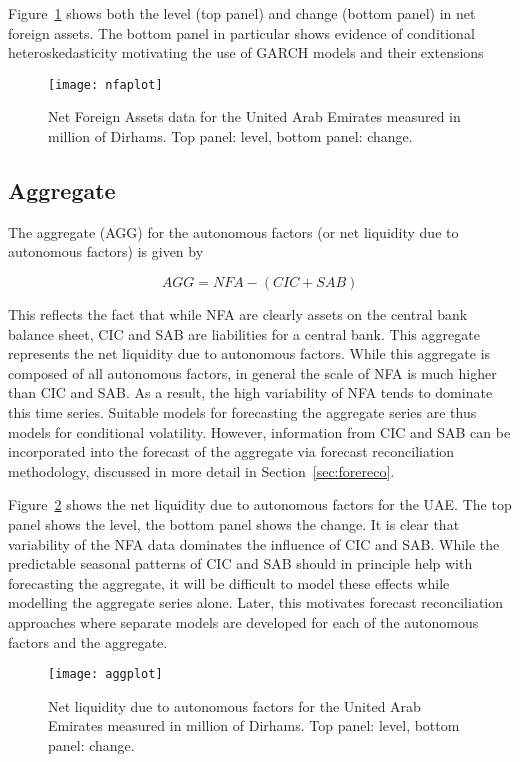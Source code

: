 Figure~\ref{fig:nfadata} shows both  the level (top panel)  and change (bottom
panel) in net foreign assets. The bottom panel in particular shows evidence of
conditional heteroskedasticity  motivating the use  of GARCH models  and their
extensions

\begin{figure}[!h] \centering \texttt{[image: nfaplot]}
    \caption{Net Foreign Assets data for  the United Arab Emirates measured in
million of Dirhams. Top panel: level, bottom panel: change.}
    \label{fig:nfadata}
\end{figure}

\subsection{Aggregate}

The  aggregate (AGG)  for  the autonomous  factors (or  net  liquidity due  to
autonomous factors) is given by

\[ AGG=NFA-(CIC+SAB)
\]

This reflects the fact  that while NFA are clearly assets  on the central bank
balance sheet, CIC and SAB are  liabilities for a central bank. This aggregate
represents the net liquidity due  to autonomous factors.  While this aggregate
is composed  of all autonomous  factors, in general the  scale of NFA  is much
higher than  CIC and SAB. As  a result, the  high variability of NFA  tends to
dominate  this time  series.  Suitable  models for  forecasting the  aggregate
series are thus models for  conditional volatility.  However, information from
CIC  and SAB  can  be incorporated  into  the forecast  of  the aggregate  via
forecast   reconciliation   methodology,   discussed   in   more   detail   in
Section~\ref{sec:forereco}.

Figure~\ref{fig:aggdata} shows the net liquidity due to autonomous factors for
the UAE. The top panel shows the  level, the bottom panel shows the change. It
is clear that variability  of the NFA data dominates the  influence of CIC and
SAB.  While  the predictable  seasonal  patterns  of  CIC  and SAB  should  in
principle help with  forecasting the aggregate, it will be  difficult to model
these  effects  while  modelling  the  aggregate  series  alone.  Later,  this
motivates  forecast  reconciliation  approaches   where  separate  models  are
developed for each of the autonomous factors and the aggregate.

\begin{figure}[!h]
    \centering
    \texttt{[image: aggplot]}
    \caption{Net liquidity due to autonomous factors for the United Arab Emirates measured in million of Dirhams. Top panel: level, bottom panel: change.}
    \label{fig:aggdata}
\end{figure}

